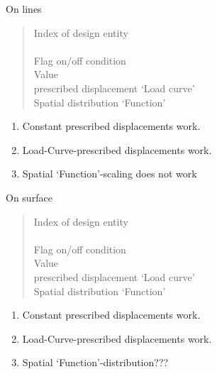 On lines
\begin{quote}
 \cnl \chs Index of design entity\\
\cod{-} \cnl \\
 \cnl \chs Flag on/off condition \\
 \cnl \chs Value\\
 \cnl
\chs prescribed displacement `Load curve'\\
 \chs Spatial distribution `Function'
\end{quote}
\begin{enumerate}
\item Constant prescribed displacements work.
\item Load-Curve-prescribed displacements work.
\item Spatial `Function'-scaling does not work 
\end{enumerate}

On surface
\begin{quote}
 \cnl \chs Index of design entity\\
\cod{-} \cnl \\
 \cnl \chs Flag on/off condition \\
 \cnl \chs Value\\
 \cnl \chs prescribed displacement `Load curve'\\
 \chs Spatial distribution `Function'
\end{quote}
\begin{enumerate}
\item Constant prescribed displacements work.
\item Load-Curve-prescribed displacements work.
\item Spatial `Function'-distribution???
\end{enumerate}

